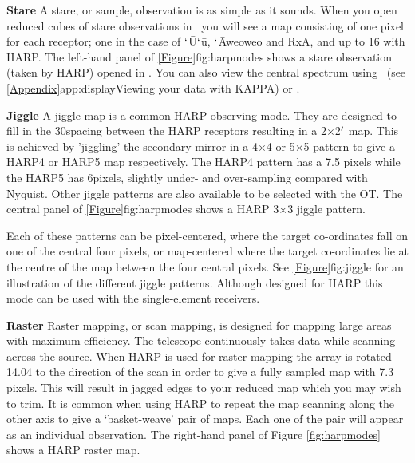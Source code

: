 \documentclass[11pt,oneside,chapters]{starlink}
\newcommand{\udeg}{\hspace{-0.3em}\dgs\hspace{-0.08em}}
\newcommand{\uarcs}{\hspace{-0.27em}\arcsec\hspace{-0.07em}}
\newcommand{\udeg}{\HCode{&deg}}
\newcommand{\uarcs}{$''$}
\begin{document}
\begin{aligndesc}
\item[\textbf{Stare}]
A stare, or sample, observation is as simple as it sounds. When you
open reduced cubes of stare observations in \gaia\ you will see a map
consisting of one pixel for each receptor; one in the case of
$`$\=U$`$\=u, $`$\=Aweoweo and RxA, and up to 16 with HARP.
The left-hand panel of \cref{Figure}{fig:harpmodes}{}
shows a stare observation (taken by HARP) opened in \gaia. You can also view the
central spectrum using \linplot\ (see \cref{Appendix}{app:display}{Viewing
your data with KAPPA}) or \splat.

\item[\textbf{Jiggle}]
A jiggle map is a common HARP observing mode. They are designed to
fill in the 30\arcsec spacing between the HARP receptors resulting in a
2\arcm$\times$2$\arcm$ map. This is achieved by 'jiggling' the secondary
mirror in a 4$\times$4 or 5$\times$5 pattern to give a HARP4 or HARP5
map respectively. The HARP4 pattern has a 7.\uarcs5 pixels while the
HARP5 has 6\arcsec pixels, slightly under- and over-sampling compared
with Nyquist. Other jiggle patterns are also available to be selected with the OT.
The central panel of \cref{Figure}{fig:harpmodes}{} shows a
HARP 3$\times$3 jiggle pattern.

Each of these patterns can be pixel-centered, where the target
co-ordinates fall on one of the central four pixels, or map-centered where
the target co-ordinates lie at the centre of the map between the four
central pixels. See \cref{Figure}{fig:jiggle}{} for an illustration of the
different jiggle patterns. Although designed for HARP this mode can be
used with the single-element receivers.

\item[\textbf{Raster}]
Raster mapping, or scan mapping, is designed for mapping large areas
with maximum efficiency. The telescope continuously takes data while
scanning across the source. When HARP is used for raster mapping the
array is rotated 14.\udeg04 to the direction of the scan in order
to give a fully sampled map with 7.\uarcs3 pixels. This will result in
jagged edges to your reduced map which you may wish to trim. It is
common when using HARP to repeat the map scanning along the other axis
to give a `basket-weave' pair of maps. Each one of the pair will
appear as an individual observation.  The right-hand panel of Figure
\ref{fig:harpmodes} shows a HARP raster map.
\end{aligndesc}
\end{document}
